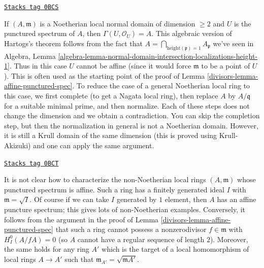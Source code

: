 \begin{remark}
\label{divisors-remark-affine-punctured-spectrum-standard-proof}
\href{https://stacks.math.columbia.edu/tag/0BCS}{\texttt{Stacks tag 0BCS}}

If $(A, \mathfrak m)$ is a Noetherian local normal domain of
dimension $\geq 2$ and $U$
is the punctured spectrum of $A$, then $\Gamma(U, \mathcal{O}_U) = A$.
This algebraic version of Hartogs's theorem follows from the fact that
$A = \bigcap_{\text{height}(\mathfrak p) = 1} A_\mathfrak p$
we've seen in Algebra, Lemma
\ref{algebra-lemma-normal-domain-intersection-localizations-height-1}.
Thus in this case $U$ cannot be affine (since it would force $\mathfrak m$
to be a point of $U$). This is often used as the starting point of
the proof of Lemma \ref{divisors-lemma-affine-punctured-spec}.
To reduce the case of a general Noetherian local ring to this case,
we first complete (to get a Nagata local ring),
then replace $A$ by $A/\mathfrak q$ for a suitable minimal prime,
and then normalize. Each of these steps does not change the
dimension and we obtain a contradiction.
You can skip the completion step, but then the normalization in
general is not a Noetherian domain. However, it is still a
Krull domain of the same dimension (this is proved using
Krull-Akizuki) and one can apply the same argument.
\end{remark}

\begin{remark}
\label{divisors-remark-affine-puctured-spectrum-general}
\href{https://stacks.math.columbia.edu/tag/0BCT}{\texttt{Stacks tag 0BCT}}

It is not clear how to characterize the non-Noetherian local
rings $(A, \mathfrak m)$ whose punctured spectrum is affine.
Such a ring has a finitely generated ideal $I$ with
$\mathfrak m = \sqrt{I}$. Of course if we can take $I$
generated by $1$ element, then $A$ has an affine puncture
spectrum; this gives lots of non-Noetherian examples.
Conversely, it follows from the argument in the proof of
Lemma \ref{divisors-lemma-affine-punctured-spec}
that such a ring cannot possess a nonzerodivisor $f \in \mathfrak m$
with $H^0_I(A/fA) = 0$ (so $A$ cannot have a regular sequence
of length $2$). Moreover, the same holds for any ring $A'$ which is
the target of a local homomorphism of local rings $A \to A'$ such that
$\mathfrak m_{A'} = \sqrt{\mathfrak mA'}$.
\end{remark}

